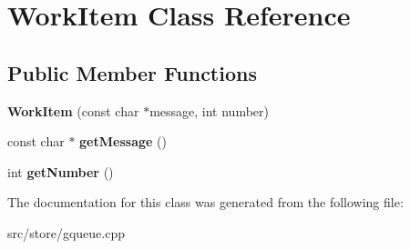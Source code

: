 \hypertarget{classWorkItem}{\section{Work\-Item Class Reference}
\label{classWorkItem}
}
\subsection*{Public Member Functions}
\begin{DoxyCompactItemize}
\item 
\hypertarget{classWorkItem_ac77d1e967d872c2ceb4de4ea3ac45c78}{{\bfseries Work\-Item} (const char $\ast$message, int number)}\label{classWorkItem_ac77d1e967d872c2ceb4de4ea3ac45c78}

\item 
\hypertarget{classWorkItem_a5e25f8c72fd1213c9e975c988e2a96c4}{const char $\ast$ {\bfseries get\-Message} ()}\label{classWorkItem_a5e25f8c72fd1213c9e975c988e2a96c4}

\item 
\hypertarget{classWorkItem_a9741f02d319a3843b62ec72b9181f71c}{int {\bfseries get\-Number} ()}\label{classWorkItem_a9741f02d319a3843b62ec72b9181f71c}

\end{DoxyCompactItemize}


The documentation for this class was generated from the following file\-:\begin{DoxyCompactItemize}
\item 
src/store/gqueue.\-cpp\end{DoxyCompactItemize}
